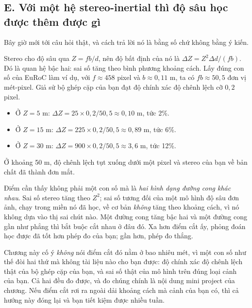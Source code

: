 \documentclass[../../deep_learning.tex]{subfiles}
\begin{document}
\subsection{E. Với một hệ stereo-inertial thì độ sâu học được thêm được gì}
Bây giờ mới tới câu hỏi thật, và cách trả lời nó là bằng số chứ không bằng ý kiến.

Stereo cho độ sâu qua \(Z = fb/d\), nên độ bất định của nó là \(\Delta Z = Z^2 \Delta d/(fb)\). Đó là quan hệ bậc hai: sai số tăng theo bình phương khoảng cách. Lấy đúng con số của EuRoC làm ví dụ, với \(f \approx 458\) pixel và \(b \approx 0{,}11\) m, ta có \(fb \approx 50{,}5\) đơn vị mét-pixel. Giả sử bộ ghép cặp của bạn đạt độ chính xác độ chênh lệch cỡ \(0{,}2\) pixel.

\begin{itemize}
\item Ở \(Z = 5\) m: \(\Delta Z = 25 \times 0{,}2/50{,}5 \approx 0{,}10\) m, tức 2\%.
\item Ở \(Z = 15\) m: \(\Delta Z = 225 \times 0{,}2/50{,}5 \approx 0{,}89\) m, tức 6\%.
\item Ở \(Z = 30\) m: \(\Delta Z = 900 \times 0{,}2/50{,}5 \approx 3{,}6\) m, tức 12\%.
\end{itemize}

Ở khoảng 50 m, độ chênh lệch tụt xuống dưới một pixel và stereo của bạn về bản chất đã thành đơn mắt.

Điểm cần thấy không phải một con số mà là \emph{hai hình dạng đường cong khác nhau}. Sai số stereo tăng theo \(Z^2\); sai số tương đối của một mô hình độ sâu đơn ảnh, chạy trong miền nó đã học, về cơ bản \emph{không} tăng theo khoảng cách, vì nó không dựa vào thị sai chút nào. Một đường cong tăng bậc hai và một đường cong gần như phẳng thì bắt buộc cắt nhau ở đâu đó. Xa hơn điểm cắt ấy, phỏng đoán học được đã tốt hơn phép đo của bạn; gần hơn, phép đo thắng.

Chương này cố ý \emph{không} nói điểm cắt đó nằm ở bao nhiêu mét, vì một con số như thế đòi hai thứ mà không tài liệu nào cho bạn được: độ chính xác độ chênh lệch thật của bộ ghép cặp của bạn, và sai số thật của mô hình trên đúng loại cảnh của bạn. Cả hai đều đo được, và đo chúng chính là nội dung mini project của chương. Nếu điểm cắt rơi ra ngoài dải khoảng cách mà cảnh của bạn có, thì cả hướng này đóng lại và bạn tiết kiệm được nhiều tuần.
\end{document}
